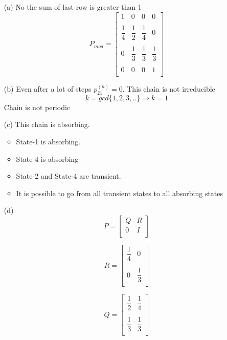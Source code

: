 \documentclass[unicode,11pt,a4paper,oneside,numbers=endperiod,openany]{scrartcl}
\begin{document}
\begin{itemize}
	\item [(a)] 
	{No the sum of last row is greater than 1}\\
	
	\[ P_{mod} = 
		\begin{bmatrix}
                1 & 0 & 0 & 0\\
                \\
                \dfrac{1}{4} & \dfrac{1}{2} & \dfrac{1}{4} & 0\\
                \\
                0 & \dfrac{1}{3} & \dfrac{1}{3} & \dfrac{1}{3}\\
                \\
                0 & 0 & 0 & 1\\
        \end{bmatrix}
   \]
	\item [(b)] 
	{Even after a lot of steps  ${p^{(n)}_{21} = 0}$. This chain is not irreducible}\\
	
	\[
	{k = gcd\{1, 2, 3, ..\}}
	\Rightarrow{ k = 1}
	\]
	{Chain is not periodic}
	
	
	
	\item [(c)] 
	{This chain is absorbing.}
	\begin{itemize}
	    \item State-1 is absorbing.
	    \item State-4 is absorbing
	    \item State-2 and State-4 are transient.
	    \item It is possible to go from all transient states to all absorbing states
	\end{itemize}
	\item [(d)] 
	\[ P = 
		\begin{bmatrix}
                Q & R\\
                0 & I\\
        \end{bmatrix}
   \]
   
   \[ R = 
		\begin{bmatrix}
                \dfrac{1}{4} & 0\\
                \\
                0 & \dfrac{1}{3}\\
        \end{bmatrix}
   \]
   
   \[ Q = 
		\begin{bmatrix}
                \dfrac{1}{2} & \dfrac{1}{4}\\
                \\
                \dfrac{1}{3} & \dfrac{1}{3}\\
        \end{bmatrix}
   \]
   

\end{itemize}
\end{document}
